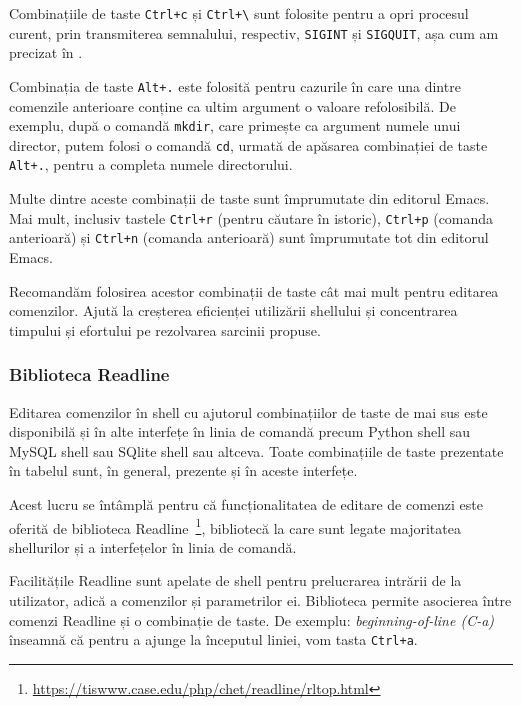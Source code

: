Combinațiile de taste \texttt{Ctrl+c} și \texttt{Ctrl+\textbackslash{}} sunt folosite pentru a opri procesul curent, prin transmiterea semnalului, respectiv, \texttt{SIGINT} și \texttt{SIGQUIT}, așa cum am precizat în \label{sec:process:signal}.

Combinația de taste \texttt{Alt+.} este folosită pentru cazurile în care una dintre comenzile anterioare conține ca ultim argument o valoare refolosibilă. De exemplu, după o comandă \texttt{mkdir}, care primește ca argument numele unui director, putem folosi o comandă \texttt{cd}, urmată de apăsarea combinației de taste \texttt{Alt+.}, pentru a completa numele directorului.

Multe dintre aceste combinații de taste sunt împrumutate din editorul Emacs. Mai mult,
inclusiv tastele \texttt{Ctrl+r} (pentru căutare în istoric), \texttt{Ctrl+p} (comanda anterioară)
și \texttt{Ctrl+n} (comanda anterioară) sunt împrumutate tot din editorul Emacs.

Recomandăm folosirea acestor combinații de taste cât mai mult pentru editarea
comenzilor. Ajută la creșterea eficienței utilizării shellului și concentrarea
timpului și efortului pe rezolvarea sarcinii propuse.

\subsubsection{Biblioteca Readline}
\label{sec:cli:shell:features:readline}

Editarea comenzilor în shell cu ajutorul combinațiilor de taste de mai sus este
disponibilă și în alte interfețe în linia de comandă precum Python shell sau
MySQL shell sau SQlite shell sau altceva. Toate combinațiile de taste prezentate în tabelul  sunt, în general, prezente și în
aceste interfețe.

Acest lucru se întâmplă pentru că funcționalitatea de editare de comenzi este
oferită de biblioteca Readline~\footnote{\url{https://tiswww.case.edu/php/chet/readline/rltop.html}}, bibliotecă la care sunt legate majoritatea
shellurilor și a interfețelor în linia de comandă.

Facilitățile Readline sunt apelate de shell pentru prelucrarea intrării de la
utilizator, adică a comenzilor și parametrilor ei. Biblioteca permite asocierea
între comenzi Readline și o combinație de taste. De exemplu: \textit{beginning-of-line
(C-a)} înseamnă că pentru a ajunge la începutul liniei, vom tasta \texttt{Ctrl+a}.

